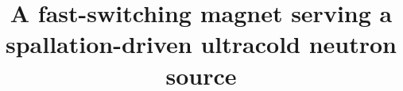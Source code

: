 \documentclass[aps,prab,twocolumn,superscriptaddress]{revtex4-1}
\begin{document}

\title{A fast-switching magnet serving a spallation-driven ultracold neutron source}


\newcommand{\UofM}{\affiliation{University of Manitoba, Winnipeg, MB R3T 2N2, Canada}}
\newcommand{\UBC}{\affiliation{The University of British Columbia, Vancouver, BC V6T 1Z1, Canada}}
\newcommand{\CERN}{\affiliation{Center for European Nuclear Research, CH-1211 Geneva 23, Switzerland}}
\newcommand{\McGill}{\affiliation{McGill University, Montreal, QC H3A 0G4, Canada}}
\newcommand{\TRIUMF}{\affiliation{TRIUMF, Vancouver, BC V6T 2A3, Canada}}
\newcommand{\UofW}{\affiliation{The University of Winnipeg, Winnipeg, Manitoba R3B 2E9, Canada}}
\newcommand{\Coburg}{\affiliation{Coburg University of Applied Sciences and Arts, 96450 Coburg, Germany}}
\newcommand{\RCNP}{\affiliation{Research Center for Nuclear Physics, Osaka University, Osaka 567-0047, Japan}}
\newcommand{\KEK}{\affiliation{High Energy Accelerator Research Organization, KEK, Tsukuba 305-0801, Japan}}
\newcommand{\Kyoto}{\affiliation{Kyoto University, Kyoto 606-8501, Japan}}
\newcommand{\UNBC}{\affiliation{University of Northern British Columbia, Prince George, BC V2N 4Z9, Canada}}
\newcommand{\SFU}{\affiliation{Simon Fraser University, Burnaby, BC V5A 1S6, Canada}}
\newcommand{\RIKEN}{\affiliation{RIKEN, Wako, Saitama 351-0198, Japan}}
\end{document}

